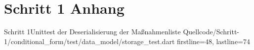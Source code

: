 \chapter{Schritt 1 Anhang} 
\label{appendix:Schritt1Anhang}

\begin{alexlisting}{Schritt 1}{Unittest der Deserialisierung der Maßnahmenliste}
    {Quellcode/Schritt-1/conditional_form/test/data_model/storage_test.dart}
    {firstline=48, lastline=74}
    \label{lst:Schritt1MassnahmenDeserialisierenOhneFehlerUnitTest}
  \end{alexlisting}